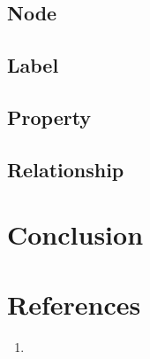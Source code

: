 \documentclass[paper=a4, fontsize=11pt]{scrartcl}
\numberwithin{equation}{section}		%
\numberwithin{figure}{section}			%
\numberwithin{table}{section}				%
\begin{document}
\subsection {Node}


\subsection {Label}


\subsection {Property}


\subsection {Relationship}


\section{Conclusion}

\newpage
\section{References}
\begin{enumerate}
    \item 
\end{enumerate}
\end{document}
